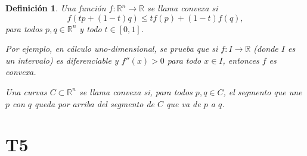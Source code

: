 \documentclass{article}
\newtheorem{definicion}{Definici\'on}
\theoremstyle{definition}
\begin{document}
  

	\begin{definicion}
	Una funci\'on $f: \mathbb{R}^n \to \mathbb{R}$ se llama convexa si 
	$$f( tp+(1-t)q ) \leq  tf(p)+(1-t)f(q),$$ 
	para todos $p,q \in \mathbb{R}^n$ y todo $t \in [0,1]$. 
	
	Por ejemplo, en c\'alculo uno-dimensional, se prueba que si $f: I \to \mathbb{R}$ (donde $I$ es un intervalo)
	es diferenciable y $f''(x)>0$ para todo $x\in I$, entonces $f$ es convexa.
	
	Una curvas $C\subset \mathbb{R}^n$ se llama convexa si, para todos $p,q\in C$, el segmento que une
	$p$ con $q$ queda por arriba del segmento de  $C$ que va de $p$ a $q$.
	
	\end{definicion}


        \section*{T5}
  
\end{document}
